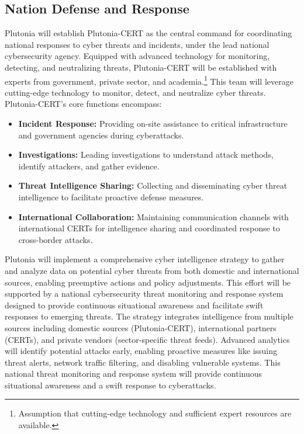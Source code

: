 \documentclass[
	a4paper, %
	10pt, %
]{CSSullivanBusinessReport}
\begin{document}
\begin{fullwidth}
\begin{justify}
\subsection{Nation Defense and Response}
Plutonia will establish Plutonia-CERT as the central command for coordinating national responses to cyber threats and incidents, under the lead national cybersecurity agency. Equipped with advanced technology for monitoring, detecting, and neutralizing threats, Plutonia-CERT will be established with experts from government, private sector, and academia.\footnote{Assumption that cutting-edge technology and sufficient expert resources are available.} This team will leverage cutting-edge technology to monitor, detect, and neutralize cyber threats. Plutonia-CERT's core functions encompass:
\begin{itemize}
	\item \textbf{Incident Response:} Providing on-site assistance to critical infrastructure and government agencies during cyberattacks.
	\item \textbf{Investigations:} Leading investigations to understand attack methods, identify attackers, and gather evidence.
	\item \textbf{Threat Intelligence Sharing:} Collecting and disseminating cyber threat intelligence to facilitate proactive defense measures.
	\item \textbf{International Collaboration:} Maintaining communication channels with international CERTs for intelligence sharing and coordinated response to cross-border attacks.
\end{itemize}
Plutonia will implement a comprehensive cyber intelligence strategy to gather and analyze data on potential cyber threats from both domestic and international sources, enabling preemptive actions and policy adjustments. This effort will be supported by a national cybersecurity threat monitoring and response system designed to provide continuous situational awareness and facilitate swift responses to emerging threats. The strategy integrates intelligence from multiple sources including domestic sources (Plutonia-CERT), international partners (CERTs), and private vendors (sector-specific threat feeds). Advanced analytics will identify potential attacks early, enabling proactive measures like issuing threat alerts, network traffic filtering, and disabling vulnerable systems. This national threat monitoring and response system will provide continuous situational awareness and a swift response to cyberattacks.

\end{justify}
\end{fullwidth}
\end{document}
